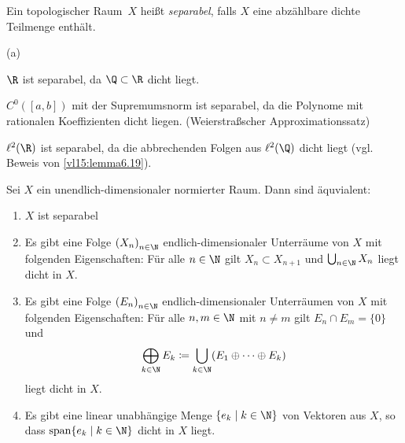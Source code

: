 \begin{thDef}[separabel]
    Ein topologischer Raum~$X$ heißt \emph{separabel}, falls $X$ eine abzählbare
    dichte Teilmenge enthält.
\end{thDef}

\begin{BspList}{(a)}
\item
    $\R$ ist separabel, da $\Q\subset\R$ dicht liegt.
\item
    $C^0([a,b])$ mit der Supremumsnorm ist separabel, da die Polynome mit
    rationalen Koeffizienten dicht liegen.  (Weierstraßscher Approximationssatz)
\item
    $\ell^2(\R)$ ist separabel, da die abbrechenden Folgen aus $\ell^2(\Q)$
    dicht liegt (vgl. Beweis von \cref{vl15:lemma6.19}).
\end{BspList}

\begin{thLemma} \label{vl15:lemma6.19}
    Sei $X$ ein unendlich-dimensionaler normierter Raum. Dann sind äquvialent:
    \begin{enumerate}[(1),labelsep=1em,leftmargin=1.5cm]
        \item \label{vl15:lemma6.19:1}
            $X$ ist separabel
            
        \item \label{vl15:lemma6.19:2}
            Es gibt eine Folge $\nSeq X$ endlich-dimensionaler
            Unterräume von $X$ mit folgenden Eigenschaften: 
            Für alle $n\in\N$ gilt $X_n\subset X_{n+1}$ und
            $\bigcup_{n\in\N} X_n$ liegt dicht in $X$.
            
        \item \label{vl15:lemma6.19:3}
            Es gibt eine Folge $\nSeq E$ endlich-dimensionaler Unterräumen von
            $X$ mit folgenden Eigenschaften:
            Für alle $n,m\in\N$ mit $n\neq m$ gilt $E_n\cap E_m = \{0\}$
            und 
            \[ \bigoplus_{k\in\N} E_k 
                \defeq \bigcup_{k\in\N} (E_1\oplus\dots\oplus E_k)
            \]
            liegt dicht in $X$.
            
        \item \label{vl15:lemma6.19:4}
            Es gibt eine linear unabhängige Menge $\{ e_k \Mid k\in\N \}$ von
            Vektoren aus $X$, so dass $\spann\{e_k \Mid k\in\N \}$ dicht in $X$
            liegt.
    \end{enumerate}
\end{thLemma}

